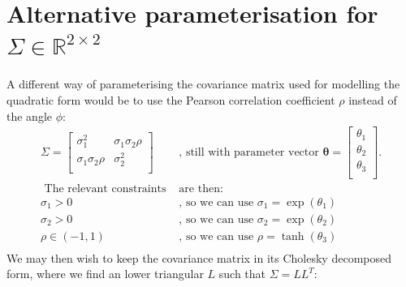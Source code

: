 \documentclass[a4paper, 12pt]{report}
\begin{document}
\section{Alternative parameterisation for $\Sigma \in \mathbb{R}^{2\times 2}$}
A different way of parameterising the covariance matrix used for modelling the quadratic form would be to use the Pearson correlation coefficient $\rho$ instead of the angle $\phi$:
\begin{align*}
\Sigma = \begin{bmatrix}
 \sigma_1^2 & \sigma_1\sigma_2\rho \\
  \sigma_1\sigma_2\rho & \sigma_2^2 \\
\end{bmatrix}& \textrm{, still with parameter vector } \boldsymbol{\theta}=\begin{bmatrix}
	\theta_1\\
	\theta_2\\
	\theta_3\\
\end{bmatrix}.\\
\textrm{ The relevant constraints }& \textrm{are then:}\\
	\sigma_1 > 0& \textrm{, so we can use } \sigma_1 = \exp(\theta_1)\\
	\sigma_2 > 0& \textrm{, so we can use } \sigma_2 = \exp(\theta_2)\\
	\rho \in (-1, 1) & \textrm{, so we can use } \rho = \tanh(\theta_3)\\
\end{align*}
We may then wish to keep the covariance matrix in its Cholesky decomposed form, where we find an lower triangular $L$ such that $\Sigma=LL^T$:
\end{document}
